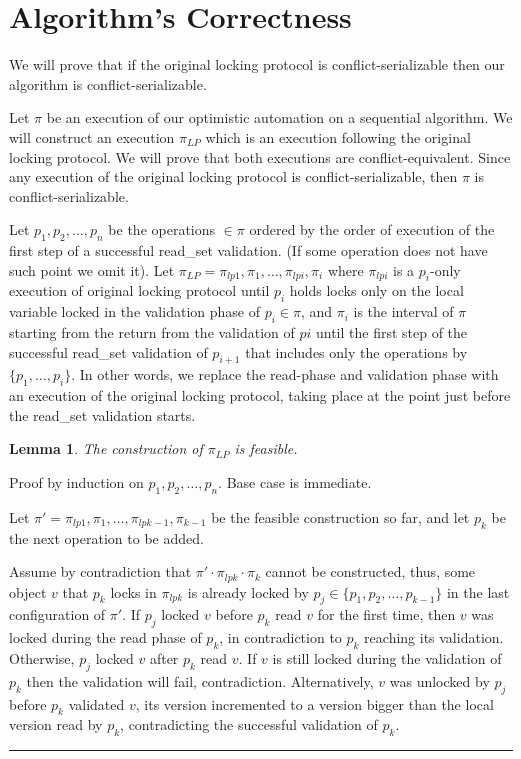 \documentclass{article}
\newtheorem{lemma}[theorem]{Lemma}
\newenvironment{proof}[1][Proof]{\begin{trivlist}
\item[\hskip \labelsep {\bfseries #1}]}{\qedsymb\end{trivlist}}
\newcommand{\qedsymb}{\hfill{\rule{2mm}{2mm}}}
\newcommand{\code}[1]{\textsf{#1}}
\newcommand{\readSet}{\code{read\_set}\xspace}
\begin{document}
\section{Algorithm's Correctness} 
We will prove that if the original locking protocol is 
conflict-serializable then our algorithm is conflict-serializable.

Let $\pi$ be an execution of our optimistic automation on a 
sequential algorithm. We will construct an execution $\pi_{LP}$ 
which is an execution following the original locking protocol. 
We will prove that both executions are conflict-equivalent. 
Since any execution of the original locking protocol
is conflict-serializable, then $\pi$ is conflict-serializable. 

Let $p_1,p_2,\ldots,p_n$ be the operations $\in\pi$ ordered by the 
order of execution of the first step of a successful \readSet 
validation. (If some operation does not have such point we omit it).
Let $\pi_{LP} = \pi_{lp1},\pi_{1},\ldots,\pi_{lpi},\pi_{i}$ where 
$\pi_{lpi}$ is a $p_i$-only execution of original locking protocol 
until $p_i$ holds locks only on the local variable locked
in the validation phase of $p_i \in \pi$, and $\pi_i$ is
the interval of $\pi$ starting from the return from the validation of
$pi$ until the first step of the successful \readSet validation of 
$p_{i+1}$ that includes only the operations by $\{p_1,\ldots,p_i\}$.
In other words, we replace the read-phase and validation phase with 
an execution of the original locking protocol, 
taking place at the point just before the \readSet validation starts. 

\begin{lemma}
The construction of $\pi_{LP}$ is feasible.  
\end{lemma}
\begin{proof}
Proof by induction on $p_1,p_2,\ldots,p_n$. Base case is immediate. 

Let $\pi' = \pi_{lp1},\pi_{1},\ldots,\pi_{lpk-1},\pi_{k-1}$ be the feasible
construction so far, and let $p_{k}$ be the next operation to be 
added. 

Assume by contradiction that $\pi'\cdot\pi_{lpk}\cdot\pi_{k}$ 
cannot be constructed, thus, some object $v$ that $p_{k}$ locks 
in $\pi_{lpk}$ is already locked 
by $p_j \in \{p_1,p_2,\ldots,p_{k-1}\}$ in
the last configuration of $\pi'$. 
If $p_j$ locked $v$ before $p_k$ read $v$ for the first time, 
then $v$ was locked during the read phase of $p_k$, 
in contradiction to $p_k$ reaching its validation. 
Otherwise, $p_j$ locked $v$ after $p_k$ read $v$. 
If $v$ is still locked during the validation of $p_k$ then 
the validation will fail, contradiction. Alternatively, $v$ 
was unlocked by $p_j$ before $p_k$ validated $v$, 
its version incremented to a version bigger 
than the local version read by $p_k$, 
contradicting the successful validation of $p_k$.  
\end{proof}
\end{document}
